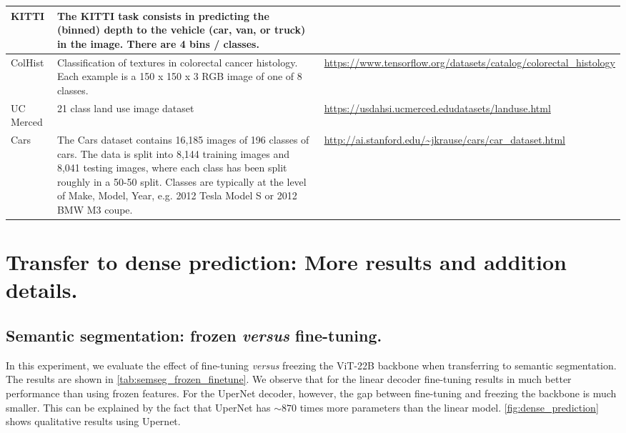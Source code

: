 \documentclass{article}
\newcommand{\chonk}{\mbox{ViT-22B}\xspace}
\begin{document}
\begin{table}[ht]
{{\begin{tabular}{l p{12cm} p{5cm}}
        KITTI & The KITTI task consists in predicting the (binned) depth to the vehicle (car, van, or truck) in the image. There are 4 bins / classes. &~\citep{geiger2013vision}\\ \midrule
        ColHist & Classification of textures in colorectal cancer histology. Each example is a 150 x 150 x 3 RGB image of one of 8 classes. & \url{https://www.tensorflow.org/datasets/catalog/colorectal_histology} \\ \midrule
        UC Merced & 21 class land use image dataset & \url{https://usdahsi.ucmerced.edudatasets/landuse.html} \\
        \midrule
        Cars &  The Cars dataset contains 16,185 images of 196 classes of cars. The data is split into 8,144 training images and 8,041 testing images, where each class has been split roughly in a 50-50 split. Classes are typically at the level of Make, Model, Year, e.g. 2012 Tesla Model S or 2012 BMW M3 coupe.& \url{http://ai.stanford.edu/~jkrause/cars/car_dataset.html} \\ \bottomrule

    \end{tabular}
    }}
    \label{table:fewshot_datasets}
\end{table}

\clearpage
\newpage
\section{Transfer to dense prediction: More results and addition details.}

\subsection{Semantic segmentation: frozen \textit{versus} fine-tuning.}

\label{app:semantic_segmentation}
In this experiment, we evaluate the effect of fine-tuning \textit{versus} freezing the \chonk backbone when transferring to semantic segmentation.
The results are shown in \cref{tab:semseg_frozen_finetune}.
We observe that for the linear decoder fine-tuning results in much better performance than using frozen features.
For the UperNet decoder, however, the gap between fine-tuning and freezing the backbone is much smaller.
This can be explained by the fact that UperNet has $\sim870$ times more parameters than the linear model.
\cref{fig:dense_prediction} shows qualitative results using Upernet.
\end{document}

